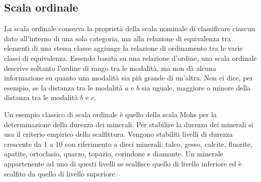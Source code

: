 

\subsection{Scala ordinale}

La scala ordinale conserva la proprietà della scala nominale di classificare ciascun dato all'interno di una sola categoria, ma alla relazione di equivalenza tra elementi di una stessa classe aggiunge la relazione di ordinamento tra le varie classi di equivalenza.  
Essendo basata su una relazione d'ordine, una scala ordinale descrive soltanto l'ordine di rango tra le modalità, ma non dà alcuna informazione su quanto una modalità sia più grande di un'altra. 
Non ci dice, per esempio, se la distanza tra le modalità $a$ e $b$ sia uguale, maggiore o minore della distanza tra le modalità $b$ e $c$. 

Un esempio classico di scala ordinale è quello della scala Mohs per la determinazione della durezza dei minerali. 
Per stabilire la durezza dei minerali si usa il criterio empirico della scalfittura.
Vengono stabiliti livelli di durezza crescente da 1 a 10 con riferimento a dieci minerali: talco, gesso, calcite, fluorite, apatite, ortoclasio, quarzo, topazio, corindone e diamante. 
Un minerale appartenente ad uno di questi livelli se scalfisce quello di livello inferiore ed è scalfito da quello di livello superiore. 

